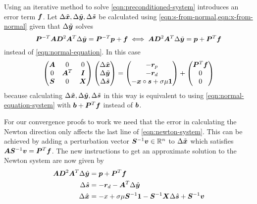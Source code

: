 Using an iterative method to solve \cref{eqn:preconditioned-system} introduces an error term \(\bm{f}\). Let \(\Delta\tilde{\bm{x}}, \Delta\tilde{\bm{y}}, \Delta\tilde{\bm{s}}\) be calculated using \cref{eqn:s-from-normal,eqn:x-from-normal} given that \(\Delta\tilde{\bm{y}}\) solves
\begin{equation}
 \bm{P}^{-T} \bm{A} \bm{D}^2 \bm{A}^T \Delta\tilde{\bm{y}} = \bm{P}^{-T} \bm{p} + \bm{f} \iff \bm{A} \bm{D}^2 \bm{A}^T \Delta\tilde{\bm{y}} = \bm{p} + \bm{P}^{T} \bm{f}
\end{equation}
instead of \cref{eqn:normal-equation}. In this case
\begin{equation}
  \begin{pmatrix}
    \bm{A} & 0         & 0       \\
    0       & \bm{A}^T & \bm{I} \\
    \bm{S} & 0         & \bm{X} \\
  \end{pmatrix}
  \begin{pmatrix} \Delta\tilde{\bm{x}} \\ \Delta\tilde{\bm{y}} \\ \Delta\tilde{\bm{s}} \end{pmatrix}
  =
  \begin{pmatrix} -\bm{r}_p \\ -\bm{r}_d \\ -\bm{x} \circ \bm{s} + \sigma \mu \bm{1} \end{pmatrix}
  +
  \begin{pmatrix} \bm{P}^T \bm{f} \\ 0 \\ 0 \end{pmatrix}
\end{equation}
because calculating \(\Delta\tilde{\bm{x}}, \Delta\tilde{\bm{y}}, \Delta\tilde{\bm{s}}\) in this way is equivalent to using \cref{eqn:normal-equation-system} with \(\bm{b} + \bm{P}^T \bm{f}\) instead of \(\bm{b}\).

For our convergence proofs to work we need that the error in calculating the Newton direction only affects the last line of \cref{eqn:newton-system}.
This can be achieved by adding a perturbation vector \(\bm{S}^{-1}\bm{v} \in \mathbb{R}^n\) to \(\Delta\tilde{\bm{x}}\) which satisfies \(\bm{A}\bm{S}^{-1}\bm{v} = \bm{P}^T \bm{f}\). %
The new instructions to get an approximate solution to the Newton system are now given by
\begin{subequations}
  \begin{align}
    \bm{A} \bm{D}^2 \bm{A}^T \Delta\hat{\bm{y}} &= \bm{p} + \bm{P}^{T} \bm{f} \\
    \Delta\hat{\bm{s}} &= -\bm{r}_d - \bm{A}^T \Delta\hat{\bm{y}} \\
    \Delta\hat{\bm{x}} &= -x + \sigma \mu \bm{S}^{-1} \bm{1} - \bm{S}^{-1} \bm{X} \Delta\hat{\bm{s}} + \bm{S}^{-1} \bm{v}
  \end{align}
\end{subequations}